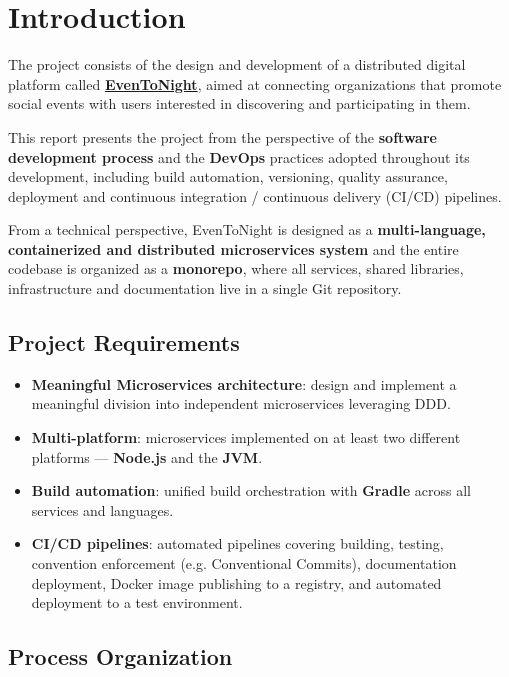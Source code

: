 \section{Introduction}

The project consists of the design and development of a distributed digital platform called \href{https://eventonight.site/}{\textbf{EvenToNight}}, aimed at connecting organizations that promote social events with users interested in discovering and participating in them.

This report presents the project from the perspective of the \textbf{software development process} and the \textbf{DevOps} practices adopted throughout its development, including build automation, versioning, quality assurance, deployment and continuous integration / continuous delivery (CI/CD) pipelines.

From a technical perspective, EvenToNight is designed as a \textbf{multi-language, containerized and distributed microservices system} and the entire codebase is organized as a \textbf{monorepo}, where all services, shared libraries, infrastructure and documentation live in a single Git repository.

\subsection{Project Requirements}

\begin{itemize}
  \item \textbf{Meaningful Microservices architecture}: design and implement a meaningful division into independent microservices leveraging DDD.
  \item \textbf{Multi-platform}: microservices implemented on at least two different platforms --- \textbf{Node.js} and the \textbf{JVM}.
  \item \textbf{Build automation}: unified build orchestration with \textbf{Gradle} across all services and languages.
  \item \textbf{CI/CD pipelines}: automated pipelines covering building, testing, convention enforcement (e.g. Conventional Commits), documentation deployment, Docker image publishing to a registry, and automated deployment to a test environment.
\end{itemize}

\subsection{Process Organization}

